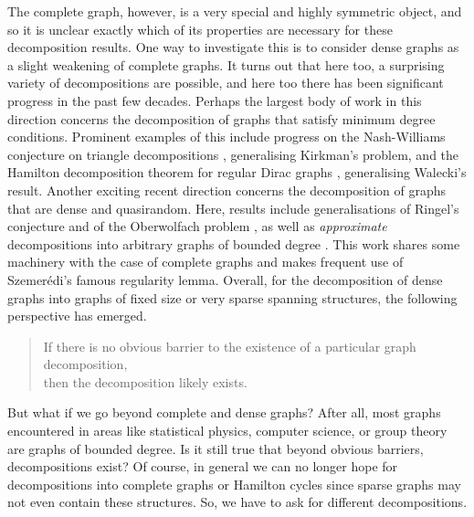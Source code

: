 \documentclass[11pt]{article}
\theoremstyle{plain}
\theoremstyle{definition}
\begin{document}
The complete graph, however, is a very special and highly symmetric object, and so it is unclear exactly which of its properties are necessary for these decomposition results. One way to investigate this is to consider dense graphs as a slight weakening of complete graphs. It turns out that here too, a surprising variety of decompositions are possible, and here too there has been significant progress in the past few decades. Perhaps the largest body of work in this direction concerns the decomposition of graphs that satisfy minimum degree conditions. Prominent examples of this include progress on the Nash-Williams conjecture on triangle decompositions \cite{barber2016edge, delcourt2021progress}, generalising Kirkman's problem, and the Hamilton decomposition theorem for regular Dirac graphs \cite{csaba2016proof}, generalising Walecki's result. Another exciting recent direction concerns the decomposition of graphs that are dense and quasirandom. Here, results include generalisations of Ringel's conjecture \cite{keevash2025ringel} and of the Oberwolfach problem \cite{keevash2022generalised}, as well as \emph{approximate} decompositions into arbitrary graphs of bounded degree \cite{kim2019blow}. This work shares some machinery with the case of complete graphs and makes frequent use of Szemer\'edi's famous regularity lemma. Overall, for the decomposition of dense graphs into graphs of fixed size or very sparse spanning structures, the following perspective has emerged.
\begin{quote}
    If there is no obvious barrier to the existence of a particular graph decomposition,\\then the decomposition likely exists.
\end{quote}

But what if we go beyond complete and dense graphs? After all, most graphs encountered in areas like statistical physics, computer science, or group theory are graphs of bounded degree. Is it still true that beyond obvious barriers, decompositions exist? Of course, in general we can no longer hope for decompositions into complete graphs or Hamilton cycles since sparse graphs may not even contain these structures. So, we have to ask for different decompositions.
\end{document}
